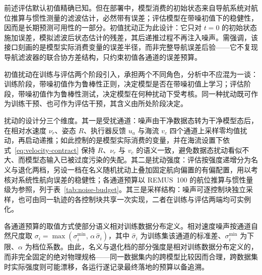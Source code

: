 前述评估默认初值精确已知。但在部署中，模型消费的初始状态来自导航系统对航位推算与惯性测量的滤波估计，必然带有误差；评估模型在带噪初值下的稳健性，因而是长期预测可用性的一部分。初值扰动正为此设计：它只对 \(t=0\) 的初始状态施加误差，模拟滤波后状态估计的残差，其后递推过程不再注入噪声。需强调，该接口刻画的是模型实际消费变量的误差半径，而非完整导航误差后验——它不复现导航滤波器的联合协方差结构，只约束初值各通道的误差预算。

初值扰动在训练与评估两个阶段引入，承担两个不同角色，分析中不应混为一谈：训练阶段，带噪初值作为鲁棒性正则，决定模型是否在带噪初值上学习；评估阶段，带噪初值作为鲁棒性测试，决定模型在何种扰动下受考核。同一种扰动既可作为训练干预、也可作为评估干预，其含义由所处阶段决定。

扰动的设计分三个维度。其一是受扰通道：噪声由干净数据态转为干净模型态后，在相对水速度 \(\nu_r\)、姿态 \(R\)、执行器反馈 \(u_a\) 与海流 \(v_c\) 四个通道上采样零均值扰动，再启动递推；如此控制的是模型实际消费的变量，并在海流设置下依式~\eqref{eq:velocity-contract} 保持 \(R\)、\(\nu_r\) 与 \(v_c\) 的语义一致，避免数据态扰动看似不大、而模型态输入已被过度污染的失配。其二是扰动强度：评估按强度递增分为名义与退化两档，另设一档在名义随机扰动上叠加固定航向偏置的有偏配置，用以考核对系统性航向误差的稳健性；各通道预算以 REMUS~100 的航位推算与惯性量级为参照，列于表~\ref{tab:noise-budget}。其三是采样结构：噪声可逐控制块独立采样，也可由同一轨迹的各控制块共享一次实现，二者在训练与评估两端均可实例化。

各通道预算的取值方式使部分语义相对训练数据分布定义。相对速度噪声按通道自然尺度取 \(\sigma_i=\max(\sigma_i^{\min},\,\alpha\,\hat\sigma_i)\)，其中 \(\hat\sigma_i\) 为训练集该通道的标准差、\(\sigma_i^{\min}\) 为下限、\(\alpha\) 为档位系数。由此，名义与退化档的部分强度是相对训练数据分布定义的，而非完全固定的绝对物理规格——同一数据集内的跨模型比较因而合理，跨数据集时实际强度则可能漂移，各运行遂记录最终落地的预算以备追溯。

